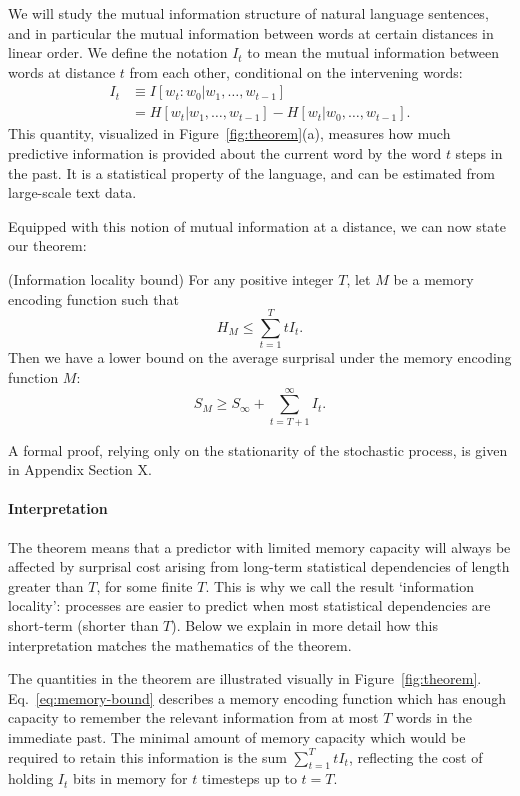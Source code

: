 We will study the mutual information structure of natural language sentences, and in particular the mutual information between words at certain distances in linear order. We define the notation $I_t$ to mean the mutual information between words at distance $t$ from each other, conditional on the intervening words:
\begin{align}
    \nonumber
    I_t &\equiv I[w_t : w_0 | w_1, \dots, w_{t-1}] \\
    \nonumber
    &= H[w_t | w_1, \dots, w_{t-1}] - H[w_t | w_0, \dots, w_{t-1}].
\end{align}
This quantity, visualized in Figure~\ref{fig:theorem}(a), measures how much predictive information is provided about the current word by the word $t$ steps in the past.
It is a statistical property of the language, and can be estimated from large-scale text data.

Equipped with this notion of mutual information at a distance, we can now state our theorem:
\begin{thm}\label{prop:suboptimal}(Information locality bound)
For any positive integer $T$, let $M$ be a memory encoding function such that
\begin{equation}
\label{eq:memory-bound}
H_M \le \sum_{t=1}^T t I_t.    
\end{equation}
Then we have a lower bound on the average surprisal under the memory encoding function $M$:
\begin{equation}
\label{eq:surprisal-bound}
S_M \ge S_\infty + \sum_{t=T+1}^\infty I_t.
\end{equation}
\end{thm}
A formal proof, relying only on the stationarity of the stochastic process, is given in Appendix Section X. 

\paragraph{Interpretation} The theorem means that a predictor with limited memory capacity will always be affected by surprisal cost arising from long-term statistical dependencies of length greater than $T$, for some finite $T$. This is why we call the result `information locality': processes are easier to predict when most statistical dependencies are short-term (shorter than $T$). Below we explain in more detail how this interpretation matches the mathematics of the theorem.

The quantities in the theorem are illustrated visually in Figure~\ref{fig:theorem}. Eq.~\ref{eq:memory-bound} describes a memory encoding function which has enough capacity to remember the relevant information from at most $T$ words in the immediate past. The minimal amount of memory capacity which would be required to retain this information is the sum $\sum_{t=1}^T t I_t$, reflecting the cost of holding $I_t$ bits in memory for $t$ timesteps up to $t=T$. 

